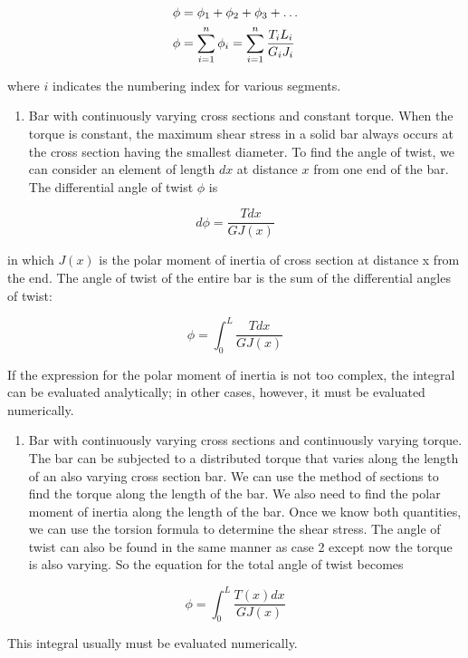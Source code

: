 \documentclass[a4paper,openany,nobib]{tufte-book}
\begin{document}
$$\begin{gathered}
         \phi  = \phi_1 + \phi_2 + \phi_3 +  \ldots  \hfill \\
         \phi  = \sum\limits_{i = 1}^n \phi_i = \sum\limits_{i = 1}^n \dfrac{T_iL_i}{G_iJ_i}  \hfill \\ 
       \end{gathered}$$

where \(i\) indicates the numbering index for various segments.

\begin{enumerate}
\item Bar with continuously varying cross sections and constant torque.
When the torque is constant, the maximum shear stress in a solid bar
always occurs at the cross section having the smallest diameter. To
find the angle of twist, we can consider an element of length \(dx\) at
distance \(x\) from one end of the bar. The differential angle of twist
\(\phi\) is
\end{enumerate}


$$d\phi  = \frac{Tdx}{GJ(x)}$$

in which \(J(x)\) is the polar moment of inertia of cross section at
distance x from the end. The angle of twist of the entire bar is the
sum of the differential angles of twist:

$$\phi  = \int_0^L \frac{Tdx}{GJ(x)}$$

If the expression for the polar moment of inertia is not too complex,
the integral can be evaluated analytically; in other cases, however,
it must be evaluated numerically.

\begin{enumerate}
\item Bar with continuously varying cross sections and continuously varying
torque. The bar can be subjected to a distributed torque that varies
along the length of an also varying cross section bar. We can use the
method of sections to find the torque along the length of the bar. We
also need to find the polar moment of inertia along the length of the
bar. Once we know both quantities, we can use the torsion formula to
determine the shear stress. The angle of twist can also be found in
the same manner as case 2 except now the torque is also varying. So
the equation for the total angle of twist becomes
\end{enumerate}


$$\phi  = \int_0^L \frac{T(x)dx}{GJ(x)}$$

This integral usually must be evaluated numerically.
\end{document}
